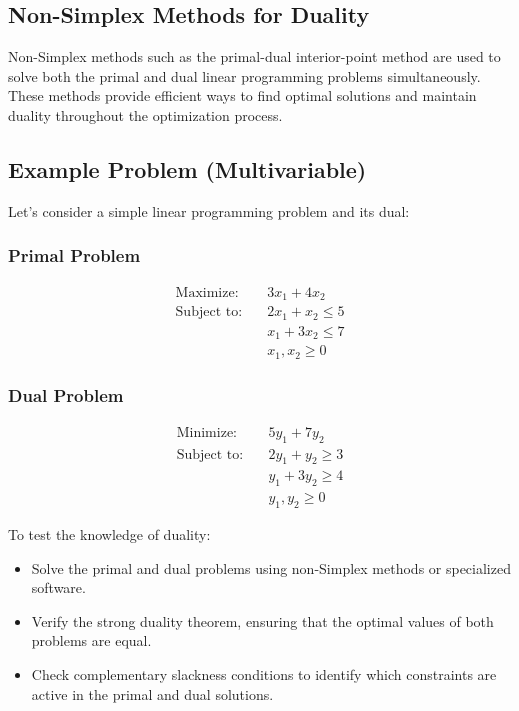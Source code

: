 \documentclass[a4paper]{article}
\begin{document}
\subsection{Non-Simplex Methods for Duality}

Non-Simplex methods such as the primal-dual interior-point method are used to solve both the primal and dual linear programming problems simultaneously. These methods provide efficient ways to find optimal solutions and maintain duality throughout the optimization process.

\subsection{Example Problem (Multivariable)}

Let's consider a simple linear programming problem and its dual:

\subsubsection{Primal Problem}
\begin{align*}
\text{Maximize:} \quad & 3x_1 + 4x_2 \\
\text{Subject to:} \quad & 2x_1 + x_2 \leq 5 \\
& x_1 + 3x_2 \leq 7 \\
& x_1, x_2 \geq 0
\end{align*}

\subsubsection{Dual Problem}
\begin{align*}
\text{Minimize:} \quad & 5y_1 + 7y_2 \\
\text{Subject to:} \quad & 2y_1 + y_2 \geq 3 \\
& y_1 + 3y_2 \geq 4 \\
& y_1, y_2 \geq 0
\end{align*}

To test the knowledge of duality:
\begin{itemize}
    \item Solve the primal and dual problems using non-Simplex methods or specialized software.
    \item Verify the strong duality theorem, ensuring that the optimal values of both problems are equal.
    \item Check complementary slackness conditions to identify which constraints are active in the primal and dual solutions.
\end{itemize}
\end{document}
